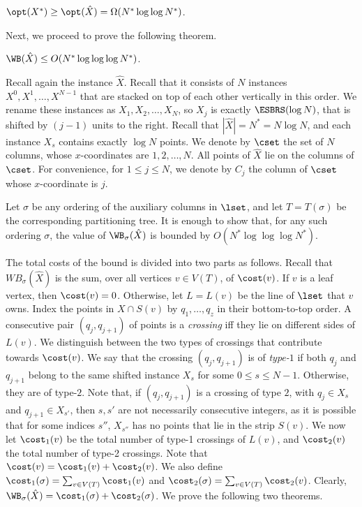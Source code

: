 \begin{claim}
	$\opt(X^*)\geq \opt(\hat{X})=\Omega(N^*\log\log N^*)$.
\end{claim}
%
%
%
%
%
%
%
%
%
%
%
%



%

%

Next, we proceed to prove the following theorem. 

\begin{theorem}\label{thm: bound for first final instance}
$\WB(\hat X)\leq O(N^*\log\log\log N^*)$.
\end{theorem}
 
Recall again the instance $\hat X$. Recall that it consists of $N$ instances $X^0,X^1,\ldots,X^{N-1}$ that are stacked on top of each other vertically in this order. 
We rename these instances as $X_1,X_2,\ldots,X_{N}$, so $X_j$ is exactly $\ESBRS(\log N)$, that is shifted by $(j-1)$ units to the right. 
Recall that $|\hat X|=N^*=N\log N$, and each instance $X_s$ contains exactly $\log N$ points.
We denote by $\cset$ the set of $N$ columns, whose $x$-coordinates are $1,2,\ldots,N$. 
All points of $\hat X$ lie on the columns of $\cset$. For convenience, for $1\leq j\leq N$, we denote by $C_j$ the column of $\cset$ whose $x$-coordinate is $j$.



Let $\sigma$ be any ordering of the auxiliary columns in $\lset$, and let $T=T({\sigma})$ be the corresponding partitioning tree.
It is enough to show that, for any such ordering $\sigma$, the value of $\WB_{\sigma}(\hat{X})$ is bounded by $O(N^*\log\log\log N^*)$. %

The total costs of the bound is divided into two parts as follows. 
Recall that $WB_{\sigma}(\hat{X})$ is the sum, over all vertices $v\in V(T)$, of $\cost(v)$. 
If $v$ is a leaf vertex, then $\cost(v)=0$. Otherwise, let $L=L(v)$ be the line of $\lset$ that $v$ owns.
Index the points in $X \cap S(v)$ by $q_1,\ldots, q_z$ in their bottom-to-top order.
A consecutive pair $(q_j, q_{j+1})$ of points is a \emph{crossing} iff they lie on different sides of $L(v)$.  
We distinguish between the two types of crossings that contribute towards $\cost(v)$. 
We say that the crossing $(q_j, q_{j+1})$ is of \emph{type-$1$} if both $q_j$ and $q_{j+1}$ belong to the same shifted instance $X_s$ for some $0\leq s\leq N-1$.
Otherwise, they are of type-$2$. 
Note that, if $(q_j,q_{j+1})$ is a crossing of type $2$, with $q_j\in X_s$ and $q_{j+1}\in X_{s'}$, then $s,s'$ are not necessarily consecutive integers, as it is possible that for some indices $s''$, $X_{s''}$ has no points that lie in the strip $S(v)$.
We now let $\cost_1(v)$ be the total number of type-1 crossings of $L(v)$, and $\cost_2(v)$ the total number of type-2 crossings. Note that $\cost(v)=\cost_1(v)+\cost_2(v)$. 
We also define $\cost_1(\sigma) = \sum_{v \in V(T)} \cost_1(v)$ and $\cost_2(\sigma) = \sum_{v \in V(T)} \cost_2(v)$. 
Clearly, $\WB_{\sigma}(\hat X)=\cost_1(\sigma)+\cost_2(\sigma)$. 
%
We  prove the following two theorems. %


